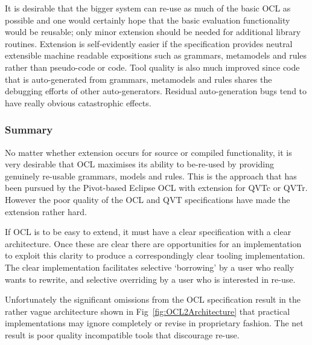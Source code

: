 \documentclass{jot}
\begin{document}
It is desirable that the bigger system can re-use as much of the basic OCL as possible and one would certainly hope that the basic evaluation functionality would be reusable; only minor extension should be needed for additional library routines. Extension is self-evidently easier if the specification provides  neutral extensible machine readable expositions such as grammars, metamodels and rules rather than pseudo-code or code. Tool quality is also much improved since code that is auto-generated from grammars, metamodels and rules shares the debugging efforts of other auto-generators. Residual auto-generation bugs tend to have really obvious catastrophic effects. 


\subsubsection{Summary}

No matter whether extension occurs for source or compiled functionality, it is very desirable that OCL maximises its ability to be-re-used by providing genuinely re-usable grammars, models and rules. This is the approach that has been pursued by the Pivot-based Eclipse OCL with extension for QVTc or QVTr. However the poor quality of the OCL and QVT specifications have made the extension rather hard.

If OCL is to be easy to extend, it must have a clear specification with a clear architecture. Once these are clear there are opportunities for an implementation to exploit this clarity to produce a correspondingly clear tooling implementation. The clear implementation facilitates selective `borrowing' by a user who really wants to rewrite, and selective overriding by a user who is interested in re-use.

Unfortunately the significant omissions from the OCL specification result in the rather vague architecture shown in Fig~\ref{fig:OCL2Architecture} that practical implementations may ignore completely or revise in proprietary fashion. The net result is poor quality incompatible tools that discourage re-use.



\end{document}
